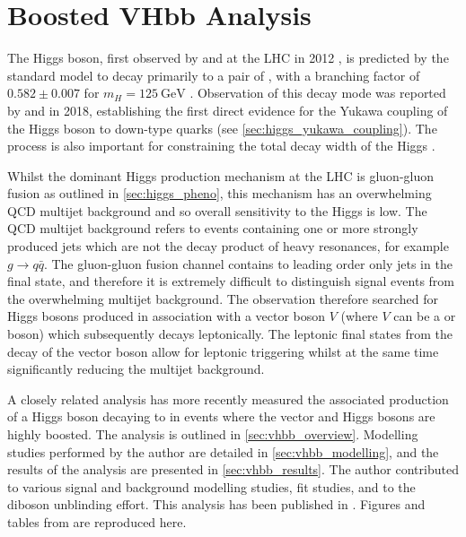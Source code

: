 \chapter{Boosted VHbb Analysis}\label{chap:vhbb_boosted}

The Higgs boson, first observed by \ATLAS and \CMS at the LHC in 2012 \cite{HIGG-2012-27,CMS-HIG-12-028}, is predicted by the standard model to decay primarily to a pair of \bquarks, with a branching factor of $0.582 \pm 0.007$ for $m_H = \SI{125}{\GeV}$ \cite{deFlorian:2016spz}. 
Observation of this decay mode was reported by \ATLAS \cite{HIGG-2018-04} and \CMS \cite{CMS-HIG-18-016} in 2018, establishing the first direct evidence for the Yukawa coupling of the Higgs boson to down-type quarks (see \cref{sec:higgs_yukawa_coupling}).
The \Hbb process is also important for constraining the total decay width of the Higgs \cite{Lafaye:2009vr}.

Whilst the dominant Higgs production mechanism at the LHC is gluon-gluon fusion as outlined in \cref{sec:higgs_pheno}, this mechanism has an overwhelming QCD multijet background and so overall sensitivity to the Higgs is low.
The QCD multijet background refers to events containing one or more strongly produced jets which are not the decay product of heavy resonances, for example $g \to q\bar{q}$.
The gluon-gluon fusion channel contains to leading order only jets in the final state, and therefore it is extremely difficult to distinguish signal events from the overwhelming multijet background.
The \hbb observation therefore searched for Higgs bosons produced in association with a vector boson $V$ (where $V$ can be a \Wboson or \Zboson boson) which subsequently decays leptonically.
The leptonic final states from the decay of the vector boson allow for leptonic triggering whilst at the same time significantly reducing the multijet background.

A closely related analysis \cite{HIGG-2018-52} has more recently measured the associated production of a Higgs boson decaying to \bquarks in events where the vector and Higgs bosons are highly boosted.
The analysis is outlined in \cref{sec:vhbb_overview}.
Modelling studies performed by the author are detailed in \cref{sec:vhbb_modelling}, and the results of the analysis are presented in \cref{sec:vhbb_results}.
The author contributed to various signal and background modelling studies, fit studies, and to the diboson unblinding effort.
This analysis has been published in .
Figures and tables from  are reproduced here.

